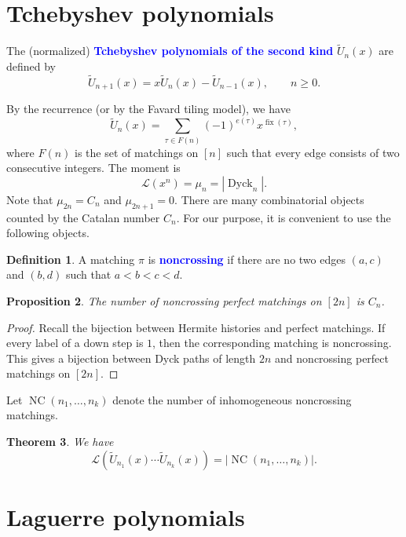 \documentclass[oneside]{book}
\numberwithin{equation}{section}
\newtheorem{thm}{Theorem}[section]
\newtheorem{prop}[thm]{Proposition}
\theoremstyle{definition}
\newtheorem{defn}[thm]{Definition}
\newcommand\NC{\operatorname{NC}}
\newcommand\fix{\operatorname{fix}}
\newcommand\LL{\mathcal{L}}
\newcommand{\Dyck}{\operatorname{Dyck}}
\renewcommand\emph[1]{\textcolor{blue}{\bf #1}}
\begin{document}
\section{Tchebyshev polynomials}

The (normalized) \emph{Tchebyshev polynomials of the second kind}
\( \widetilde{U}_n(x) \) are defined by
  \[
    \widetilde{U}_{n+1}(x) = x \widetilde{U}_n(x) - \widetilde{U}_{n-1}(x), \qquad n\ge0.
  \]

  By the recurrence (or by the Favard tiling model), we have
  \begin{equation}\label{eq:72}
    \widetilde{U}_n(x) = \sum_{\tau\in F(n)} (-1)^{e(\tau)} x^{\fix(\tau)},
  \end{equation}
  where \( F(n) \) is the set of matchings on \( [n] \) such that
  every edge consists of two consecutive integers. The moment is
  \[
    \LL(x^n) = \mu_n = |\Dyck_{n}|.
  \]
  Note that \( \mu_{2n} = C_n \) and \( \mu_{2n+1} = 0 \).
  There are many combinatorial objects counted by the Catalan number \( C_n \).
  For our purpose, it is convenient to use the following objects.

\begin{defn}
  A matching \( \pi \) is \emph{noncrossing} if there are no two edges
  \( (a,c) \) and \( (b,d) \) such that \( a<b<c<d \).
\end{defn}

\begin{prop}\label{pro:6}
The number of noncrossing perfect matchings on \( [2n] \)
is \( C_n \).
\end{prop}

\begin{proof}
  Recall the bijection between Hermite histories and perfect
  matchings. If every label of a down step is \( 1 \), then the
  corresponding matching is noncrossing. This gives a bijection
  between Dyck paths of length \( 2n \) and noncrossing perfect
  matchings on \( [2n] \).
\end{proof}

  
  Let \( \NC(n_1,\dots,n_k) \) denote the number of inhomogeneous
  noncrossing matchings.


\begin{thm}
  We have
\[
  \LL(\widetilde{U}_{n_1}(x)\cdots \widetilde{U}_{n_k}(x))
  = |\NC(n_1,\dots,n_k)|.
\]
\end{thm}


\section{Laguerre polynomials}
\end{document}
